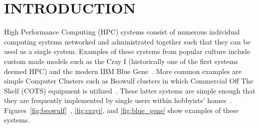 \documentclass[oneside,12pt]{memoir}
\begin{document}
	\newpage
\vspace*{\fill}
\begingroup
\hspace*{\fill}
\hspace*{\fill}
\endgroup
\vspace*{\fill}

\tableofcontents

\listoffigures

\mainmatter
\pagestyle{asu} 

\chapter{INTRODUCTION}
\label{chap:introduction}
High Performance Computing (HPC) systems consist of numerous individual computing systems networked and administrated together such that they can be used as a single system. Examples of these systems from popular culture include custom made models such as the Cray I (historically one of the first systems deemed HPC) and the modern IBM Blue Gene~\cite{leavitt2012big}. More common examples are simple Computer Clusters such as Beowulf clusters in which Commercial Off The Shelf (COTS) equipment is utilized~\cite{buyya1999high}. These latter systems are simple enough that they are frequently implemented by single users within hobbyists' homes~\cite{brown2004engineering}. Figures~\ref{fig:beowulf}~, \ref{fig:crayi}, and \ref{fig:blue_gene} show examples of these systems.
\end{document}
